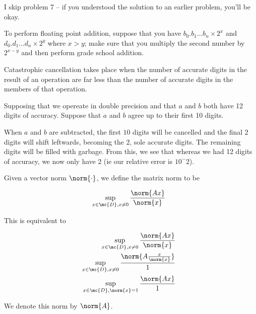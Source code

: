 \documentclass[../main.tex]{subfiles}
\begin{document}
I skip problem 7 -- if you understood the solution to an earlier problem, you'll be okay.

\begin{example}
    To perform floating point addition, suppose that you have
    $b_0.b_1 \dots b_n \times 2^{x}$ and 
    $d_0.d_1 \dots d_n \times 2^{y}$ where $x > y$; make sure
    that you multiply the second number by $2^{x-y}$ and then perform grade school addition.
\end{example}

\begin{definition}
    Catastrophic cancellation takes place when the number of
    accurate digits in the result of an operation are far
    less than the number of accurate digits in the members
    of that operation.
\end{definition}

\begin{example}
    Supposing that we opereate in double precision and that
    $a$ and $b$ both have 12 digits of accuracy. Suppose
    that $a$ and $b$ agree up to their first 10 digits.

    When $a$ and $b$ are subtracted, the first $10$ digits
    will be cancelled and the final 2 digits will shift
    leftwards, becoming the $2$, sole accurate digits. The
    remaining digits will be filled with garbage. From this,
    we see that whereas we had 12 digits of accuracy, we now
    only have 2 (ie our relative error is $10^-2$).
\end{example}

\begin{definition}
    Given a vector norm $\norm{\cdot}$, we define the matrix norm to be

    \[
        \sup_{x \in \mc{D}, x \not = 0} \frac{\norm{Ax}}{\norm{x}}
    \]

    This is equivalent to

    \begin{align*}
        \sup_{x \in \mc{D}, x \not = 0} \frac{\norm{Ax}}{\norm{x}} \\
        \sup_{x \in \mc{D}, x \not = 0} \frac{\norm{A\frac{x}{\norm{x}}}}{1} \\
        \sup_{x \in \mc{D}, \norm{x} = 1} \frac{\norm{Ax}}{1} \\
    \end{align*}

    We denote this norm by $\norm{A}$.
\end{definition}
\end{document}
